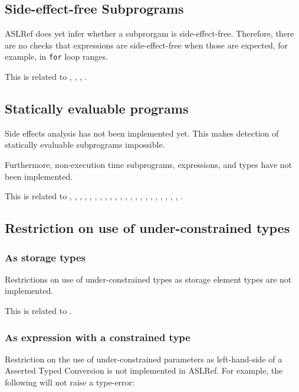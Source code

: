 \documentclass{book}
\begin{document}
\subsection{Side-effect-free Subprograms}
ASLRef does yet infer whether a subprorgam is side-effect-free.
Therefore, there are no checks that expressions are side-effect-free when those are expected,
for example, in \texttt{for} loop ranges.

This is related to , , , .

\subsection{Statically evaluable programs}%
\label{sec:nyi:statically-evaluable-subprograms}

Side effects analysis has not been implemented yet.
%
This makes detection of statically evaluable subprograms impossible.

Furthermore, non-execution time subprograms, expressions, and types have not
been implemented.

This is related to , , , ,
, , , , ,
, , , , ,
, , , , ,
, , , .

\subsection{Restriction on use of under-constrained types}

\subsubsection{As storage types}
Restrictions on use of under-constrained types as storage element types are not
implemented.

This is related to .

\subsubsection{As expression with a constrained type}

Restriction on the use of under-constrained parameters as left-hand-side of a
Asserted Typed Conversion is not implemented in ASLRef.
%
For example, the following will not raise a type-error:
\end{document}
